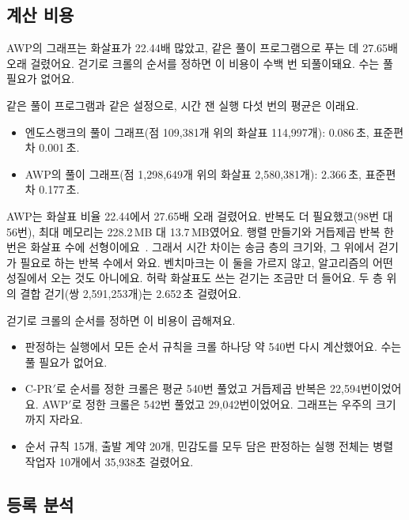 \subsection{계산 비용}

\begin{yoji}
AWP의 그래프는 화살표가 22.44배 많았고, 같은 풀이 프로그램으로 푸는 데 27.65배 오래 걸렸어요. 걷기로 크롤의 순서를 정하면 이 비용이 수백 번 되풀이돼요. 수는 풀 필요가 없어요.
\end{yoji}

같은 풀이 프로그램과 같은 설정으로, 시간 잰 실행 다섯 번의 평균은 이래요.
\begin{itemize}
\item 엔도스랭크의 풀이 그래프(점 109,381개 위의 화살표 114,997개): 0.086\,초, 표준편차 0.001\,초.
\item AWP의 풀이 그래프(점 1,298,649개 위의 화살표 2,580,381개): 2.366\,초, 표준편차 0.177\,초.
\end{itemize}
AWP는 화살표 비율 22.44에서 27.65배 오래 걸렸어요. 반복도 더 필요했고(98번 대 56번), 최대 메모리는 228.2\,MB 대 13.7\,MB였어요. 행렬 만들기와 거듭제곱 반복 한 번은 화살표 수에 선형이에요~\cite{leskovec2020mining}. 그래서 시간 차이는 송금 층의 크기와, 그 위에서 걷기가 필요로 하는 반복 수에서 와요. 벤치마크는 이 둘을 가르지 않고, 알고리즘의 어떤 성질에서 오는 것도 아니에요. 허락 화살표도 쓰는 걷기는 조금만 더 들어요. 두 층 위의 결합 걷기(쌍 2,591,253개)는 2.652\,초 걸렸어요.

걷기로 크롤의 순서를 정하면 이 비용이 곱해져요.
\begin{itemize}
\item 판정하는 실행에서 모든 순서 규칙을 크롤 하나당 약 540번 다시 계산했어요. 수는 풀 필요가 없어요.
\item C-PR$'$로 순서를 정한 크롤은 평균 540번 풀었고 거듭제곱 반복은 22,594번이었어요. AWP$'$로 정한 크롤은 542번 풀었고 29,042번이었어요. 그래프는 우주의 크기까지 자라요.
\item 순서 규칙 15개, 출발 계약 20개, 민감도를 모두 담은 판정하는 실행 전체는 병렬 작업자 10개에서 35,938초 걸렸어요.
\end{itemize}

\subsection{등록 분석}
\label{sec:registered}

